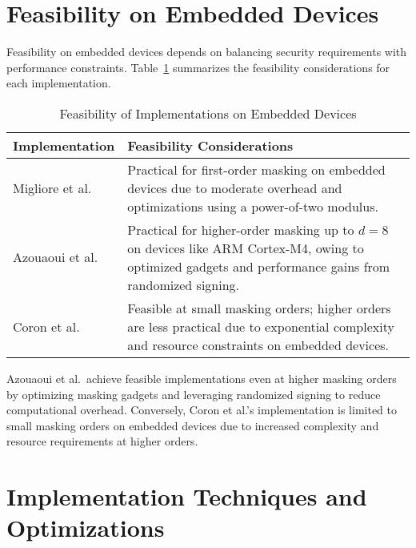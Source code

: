 \section{Feasibility on Embedded Devices}

Feasibility on embedded devices depends on balancing security requirements with performance constraints. Table~\ref{tab:feasibility} summarizes the feasibility considerations for each implementation.

\begin{table}[h]
    \centering
    \renewcommand{\arraystretch}{1.2} %
    \caption{Feasibility of Implementations on Embedded Devices}
    \begin{tabular}{l | p{10cm}} %
        \toprule
        \textbf{Implementation}            & \textbf{Feasibility Considerations}                                                                                                                     \\
        \midrule
        Migliore et al.\ \cite{Migliore19} & Practical for first-order masking on embedded devices due to moderate overhead and optimizations using a power-of-two modulus.                          \\
        Azouaoui et al.\ \cite{Azouaoui22} & Practical for higher-order masking up to $d=8$ on devices like ARM Cortex-M4, owing to optimized gadgets and performance gains from randomized signing. \\
        Coron et al.\ \cite{Coron23}       & Feasible at small masking orders; higher orders are less practical due to exponential complexity and resource constraints on embedded devices.          \\
        \bottomrule
    \end{tabular}
    \label{tab:feasibility}
\end{table}


Azouaoui et al.\ achieve feasible implementations even at higher masking orders by optimizing masking gadgets and leveraging randomized signing to reduce computational overhead. Conversely, Coron et al.'s implementation is limited to small masking orders on embedded devices due to increased complexity and resource requirements at higher orders.

\section{Implementation Techniques and Optimizations}

